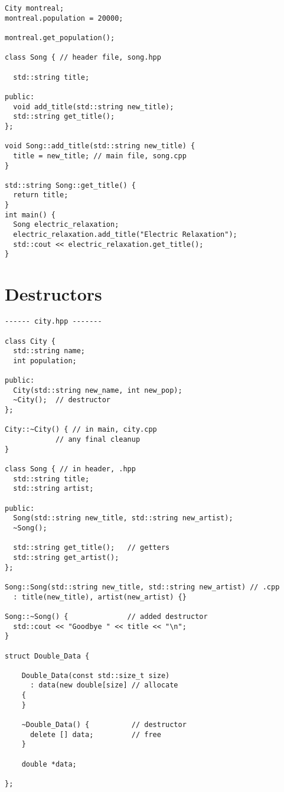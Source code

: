 \documentclass[openany]{report}
\begin{document}
\begin{verbatim}
City montreal;
montreal.population = 20000;

montreal.get_population();

class Song { // header file, song.hpp

  std::string title;

public:
  void add_title(std::string new_title);
  std::string get_title();
};

void Song::add_title(std::string new_title) {
  title = new_title; // main file, song.cpp
}

std::string Song::get_title() {
  return title;
}
int main() {
  Song electric_relaxation;
  electric_relaxation.add_title("Electric Relaxation");
  std::cout << electric_relaxation.get_title();
}
\end{verbatim}

\section{Destructors}

\begin{verbatim}
------ city.hpp -------

class City { 
  std::string name;
  int population;
 
public:
  City(std::string new_name, int new_pop);
  ~City();  // destructor
};
 
City::~City() { // in main, city.cpp
            // any final cleanup
}

class Song { // in header, .hpp
  std::string title;
  std::string artist;

public:
  Song(std::string new_title, std::string new_artist);
  ~Song();
  
  std::string get_title();   // getters
  std::string get_artist();
};

Song::Song(std::string new_title, std::string new_artist) // .cpp
  : title(new_title), artist(new_artist) {}

Song::~Song() {              // added destructor
  std::cout << "Goodbye " << title << "\n";
}

struct Double_Data {

    Double_Data(const std::size_t size)
      : data(new double[size] // allocate
    {
    }

    ~Double_Data() {          // destructor
      delete [] data;         // free
    }

    double *data;

};
\end{verbatim}
\end{document}
